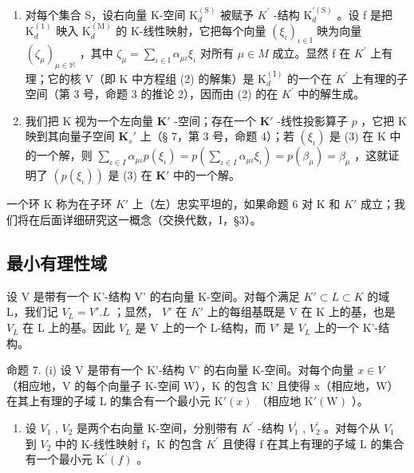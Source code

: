 \begin{enumerate}
\def\labelenumi{(\roman{enumi})}
\item
  对每个集合 S，设右向量 K-空间 \(\mathrm{K}_{d}^{(\mathrm{S})}\) 被赋予 \(K^{\prime}\) -结构 \(\mathrm{K}_{d}^{\prime(\mathrm{S})}\) 。设 f 是把 \(\mathrm{K}_{d}^{(1)}\) 映入 \(\mathrm{K}_{d}^{(\mathrm{M})}\) 的 K-线性映射，它把每个向量 \((\xi_{\iota})_{\iota\in\mathbb{I}}\) 映为向量 \((\zeta_{\mu})_{\mu\in\mathbb{M}}\) ，其中 \(\zeta_{\mu}=\sum_{\iota\in\mathbb{I}}\alpha_{\mu\iota}\xi_{\iota}\) 对所有 \(\mu\in M\) 成立。显然 f 在 \(K^{\prime}\) 上有理；它的核 V（即 K 中方程组 (2) 的解集）是 \(\mathrm{K}_{d}^{(\mathrm{I})}\) 的一个在 \(K^{\prime}\) 上有理的子空间（第 3 号，命题 3 的推论 2），因而由 (2) 的在 \(K^{\prime}\) 中的解生成。
\item
  我们把 K 视为一个左向量 \(\mathbf{K}'\) -空间；存在一个 \(\mathbf{K}'\) -线性投影算子 \(p\) ，它把 K 映到其向量子空间 \(\mathbf{K}_s'\) 上（§ 7，第 3 号，命题 4）；若 \((\xi_{\iota})\) 是 (3) 在 K 中的一个解，则 \(\sum_{\iota \in I} \alpha_{\mu \iota} p(\xi_{\iota}) = p\left(\sum_{\iota \in I} \alpha_{\mu \iota} \xi_{\iota}\right) = p(\beta_\mu) = \beta_\mu\) ，这就证明了 \((p(\xi_{\iota}))\) 是 (3) 在 \(\mathbf{K}'\) 中的一个解。
\end{enumerate}

一个环 K 称为在子环 \(K'\) 上（左）忠实平坦的，如果命题 6 对 K 和 \(K'\) 成立；我们将在后面详细研究这一概念（交换代数，I，§3）。

\subsection{最小有理性域}

设 V 是带有一个 K'-结构 V' 的右向量 K-空间。对每个满足 \(K' \subset L \subset K\) 的域 L，我们记 \(V_{L} = V'. L\) ；显然， \(V'\) 在 \(K'\) 上的每组基既是 V 在 K 上的基，也是 \(V_{L}\) 在 L 上的基。因此 \(V_{L}\) 是 V 上的一个 L-结构，而 \(V'\) 是 \(V_{L}\) 上的一个 K'-结构。

命题 7. (i) 设 V 是带有一个 K'-结构 V' 的右向量 K-空间。对每个向量 \(x \in V\) （相应地，V 的每个向量子 K-空间 W），K 的包含 K' 且使得 x（相应地，W）在其上有理的子域 L 的集合有一个最小元 \(\mathrm{K}'(x)\) （相应地 \(\mathrm{K}'(\mathrm{W})\) ）。

\begin{enumerate}
\def\labelenumi{(\roman{enumi})}
\setcounter{enumi}{1}
\tightlist
\item
  设 \(V_{1}\) , \(V_{2}\) 是两个右向量 K-空间，分别带有 \(K^{\prime}\) -结构 \(V_{1}^{\prime}\) , \(V_{2}^{\prime}\) 。对每个从 \(V_{1}\) 到 \(V_{2}\) 中的 K-线性映射 f，K 的包含 \(K^{\prime}\) 且使得 f 在其上有理的子域 L 的集合有一个最小元 \(\mathrm{K}^{\prime}(f)\) 。
\end{enumerate}

